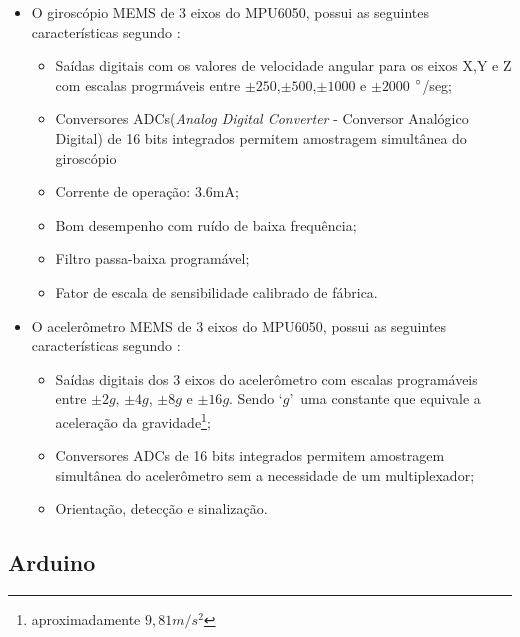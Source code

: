 	\begin{description}
		\item[Características do MPU6050] 
		\item \begin{itemize}
			 
			\item  O giroscópio MEMS de 3 eixos do MPU6050, possui as seguintes características segundo \cite{mpu6050}:
			\begin{itemize}
				\item Saídas digitais com os valores de velocidade angular para os eixos X,Y e Z com escalas progrmáveis entre $ \pm250 $,$ \pm500 $,$ \pm1000 $ e $ \pm 2000$ $\degree$/seg;
				\item Conversores ADCs(\textit{Analog Digital Converter} - Conversor Analógico Digital) de 16 bits integrados permitem amostragem simultânea do giroscópio
				\item Corrente de operação: 3.6mA;
				\item Bom desempenho com ruído de baixa frequência;
				\item Filtro passa-baixa programável;
				\item Fator de escala de sensibilidade calibrado de fábrica.
			\end{itemize}
			
			\item O acelerômetro MEMS de 3 eixos do MPU6050, possui as seguintes características segundo \cite{mpu6050}:
			\begin{itemize}
				\item Saídas digitais dos 3 eixos do acelerômetro com escalas programáveis entre $\pm2g$, $\pm4g$, $\pm8g$ e $\pm16g$. Sendo \textquoteleft$ g$\textquoteright \ uma constante que equivale a aceleração da gravidade\footnote{aproximadamente $9,81 m/s^2 $};
				\item Conversores ADCs de 16 bits integrados permitem amostragem simultânea do acelerômetro sem a necessidade de um multiplexador;
				\item Orientação, detecção e sinalização.
				
			\end{itemize}
		\end{itemize}
	\end{description}
	
	
	

\subsection{Arduino}

